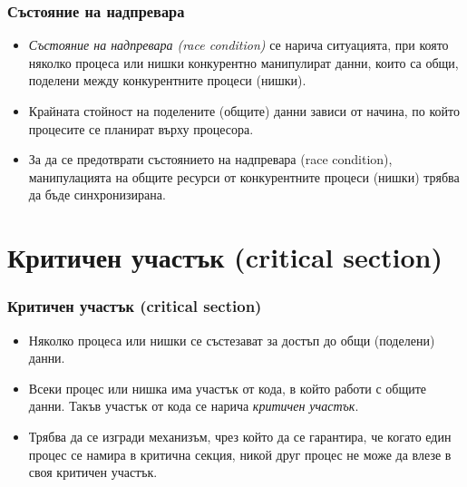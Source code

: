 \documentclass[ignorenonframetext, hyperref=unicode,compress]{beamer}
\begin{document}
\begin{frame}[containsverbatim]
\frametitle{Състояние на надпревара}
\begin{itemize}
  \item {\em Състояние на надпревара (race condition)} се нарича ситуацията, при която
  няколко
  процеса или нишки конкурентно манипулират данни, които са общи, поделени между
  конкурентните процеси (нишки).
  \item Крайната стойност на поделените (общите) данни зависи от начина, по
  който процесите се планират върху процесора.
  \item За да се предотврати състоянието на надпревара (race condition),
  манипулацията на общите ресурси от конкурентните процеси (нишки) трябва да
  бъде синхронизирана.
\end{itemize}
\end{frame}

\section{Критичен участък (critical section)}

\begin{frame}[containsverbatim]
\frametitle{Критичен участък (critical section)}
\begin{itemize}
  \item Няколко процеса или нишки се състезават за достъп до общи (поделени)
  данни.
  \item Всеки процес или нишка има участък от кода, в който работи с общите
  данни. Такъв участък от кода се нарича {\em критичен участък}. 
  \item Трябва да се изгради механизъм, чрез който да се гарантира, че когато
  един процес се намира в критична секция, никой друг процес не може да
  влезе в своя критичен участък.
\end{itemize}
\end{frame}
\end{document}
